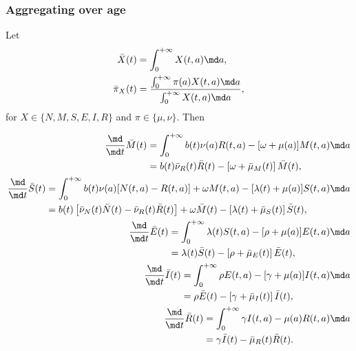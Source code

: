 \documentclass{jpmarticle}
\let\subequationsorig\subequations%
\let\endsubequationsorig\endsubequations%
\renewenvironment{subequations}{
  \subequationsorig
  \renewcommand{\theequation}{\theparentequation.\arabic{equation}}
}{
  \endsubequationsorig
}
\begin{document}
\subsubsection{Aggregating over age}

Let
\begin{align}
  \bar{X}(t) &= \int_0^{+\infty} X(t, a) \md a,
  \\
  \bar{\pi}_X(t)
  &= \frac{\int_0^{+\infty} \pi(a) X(t, a) \md a}
  {\int_0^{+\infty} X(t, a) \md a},
\end{align}
for $X \in \{N, M, S, E, I, R\}$ and $\pi \in \{\mu, \nu\}$. Then
\begin{subequations}
  \begin{align}
    \begin{split}
      \frac{\md}{\md t} \bar{M}(t)
      &= \int_0^{+\infty} b(t) \nu(a) R(t, a)
      - [\omega + \mu(a)] M(t, a) \md a
      \\
      &= b(t) \bar{\nu}_R(t) \bar{R}(t)
      - \left[\omega + \bar{\mu}_M(t)\right] \bar{M}(t),
    \end{split}
    \\
    \begin{split}
      \frac{\md}{\md t} \bar{S}(t)
      &= \int_0^{+\infty} b(t) \nu(a) [N(t, a) - R(t, a)]
      + \omega M(t, a) - [\lambda(t) + \mu(a)] S(t, a) \md a
      \\
      &= b(t) \left[
        \bar{\nu}_N(t) \bar{N}(t)
        - \bar{\nu}_R(t) \bar{R}(t)
      \right]
      + \omega \bar{M}(t)
      - \left[\lambda(t) + \bar{\mu}_S(t)\right] \bar{S}(t),
    \end{split}
    \\
    \begin{split}
      \frac{\md}{\md t} \bar{E}(t)
      &= \int_0^{+\infty} \lambda(t) S(t, a)
      - [\rho + \mu(a)] E(t, a) \md a
      \\
      &= \lambda(t) \bar{S}(t)
      - \left[\rho + \bar{\mu}_E(t)\right] \bar{E}(t),
    \end{split}
    \\
    \begin{split}
      \frac{\md}{\md t} \bar{I}(t)
      &= \int_0^{+\infty} \rho E(t, a)
      - [\gamma + \mu(a)] I(t, a) \md a
      \\
      &= \rho \bar{E}(t)
      - \left[\gamma + \bar{\mu}_I(t)\right] \bar{I}(t),
    \end{split}
    \\
    \begin{split}
      \frac{\md}{\md t} \bar{R}(t)
      &= \int_0^{+\infty} \gamma I(t, a)
      - \mu(a) R(t, a) \md a
      \\
      &= \gamma \bar{I}(t)
      - \bar{\mu}_R(t) \bar{R}(t).
    \end{split}
  \end{align}
\end{subequations}
\end{document}
